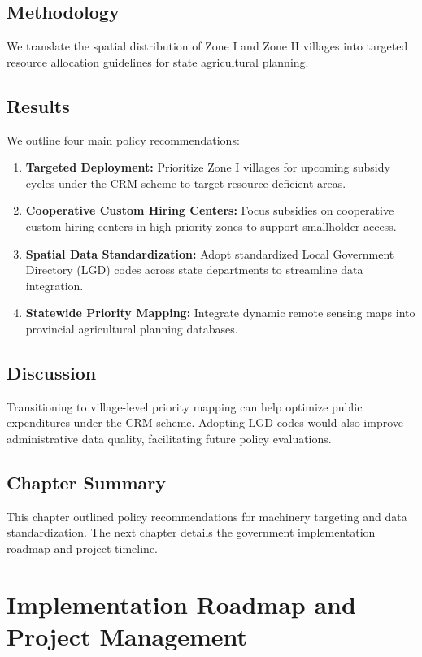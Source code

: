 \documentclass[12pt,a4paper]{report}
\begin{document}
\section{Methodology}
We translate the spatial distribution of Zone I and Zone II villages into targeted resource allocation guidelines for state agricultural planning.

\section{Results}
We outline four main policy recommendations:
\begin{enumerate}
    \item \textbf{Targeted Deployment:} Prioritize Zone I villages for upcoming subsidy cycles under the CRM scheme to target resource-deficient areas.
    \item \textbf{Cooperative Custom Hiring Centers:} Focus subsidies on cooperative custom hiring centers in high-priority zones to support smallholder access.
    \item \textbf{Spatial Data Standardization:} Adopt standardized Local Government Directory (LGD) codes across state departments to streamline data integration.
    \item \textbf{Statewide Priority Mapping:} Integrate dynamic remote sensing maps into provincial agricultural planning databases.
\end{enumerate}

\section{Discussion}
Transitioning to village-level priority mapping can help optimize public expenditures under the CRM scheme. Adopting LGD codes would also improve administrative data quality, facilitating future policy evaluations.

\section{Chapter Summary}
This chapter outlined policy recommendations for machinery targeting and data standardization. The next chapter details the government implementation roadmap and project timeline.

\chapter{Implementation Roadmap and Project Management}
\label{ch:roadmap}
\end{document}
